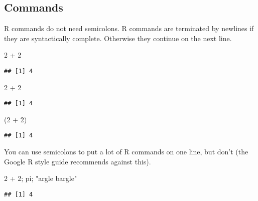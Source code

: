 \documentclass[
]{article}
\newenvironment{Shaded}{\begin{snugshade}}{\end{snugshade}}
\newcommand{\DecValTok}[1]{\textcolor[rgb]{0.00,0.00,0.81}{#1}}
\newcommand{\NormalTok}[1]{#1}
\newcommand{\SpecialCharTok}[1]{\textcolor[rgb]{0.00,0.00,0.00}{#1}}
\newcommand{\StringTok}[1]{\textcolor[rgb]{0.31,0.60,0.02}{#1}}
\begin{document}
\hypertarget{commands}{%
\subsection{Commands}\label{commands}}

R commands do not need semicolons. R commands are terminated by newlines
if they are syntactically complete. Otherwise they continue on the next
line.

\begin{Shaded}
\begin{Highlighting}[]
\DecValTok{2} \SpecialCharTok{+} \DecValTok{2}
\end{Highlighting}
\end{Shaded}

\begin{verbatim}
## [1] 4
\end{verbatim}

\begin{Shaded}
\begin{Highlighting}[]
\DecValTok{2} \SpecialCharTok{+}
\DecValTok{2}
\end{Highlighting}
\end{Shaded}

\begin{verbatim}
## [1] 4
\end{verbatim}

\begin{Shaded}
\begin{Highlighting}[]
\NormalTok{(}\DecValTok{2}
\SpecialCharTok{+} \DecValTok{2}\NormalTok{)}
\end{Highlighting}
\end{Shaded}

\begin{verbatim}
## [1] 4
\end{verbatim}

You can use semicolons to put a lot of R commands on one line, but don't
(the Google R style guide recommends against this).

\begin{Shaded}
\begin{Highlighting}[]
\DecValTok{2} \SpecialCharTok{+} \DecValTok{2}\NormalTok{; pi; }\StringTok{"argle bargle"}
\end{Highlighting}
\end{Shaded}

\begin{verbatim}
## [1] 4
\end{verbatim}
\end{document}
